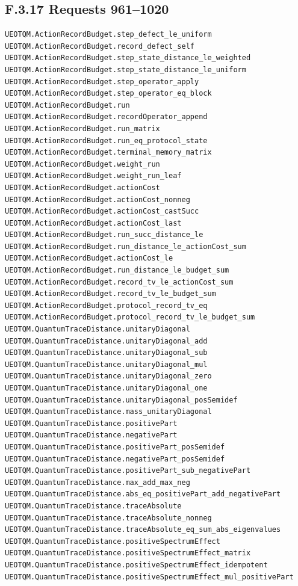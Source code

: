\documentclass[
  11pt,
  oneside]{book}
\begin{document}
\subsection{F.3.17 Requests 961--1020}

\begin{Verbatim}[breaklines,breakanywhere,fontsize=\scriptsize]
UEOTQM.ActionRecordBudget.step_defect_le_uniform
UEOTQM.ActionRecordBudget.record_defect_self
UEOTQM.ActionRecordBudget.step_state_distance_le_weighted
UEOTQM.ActionRecordBudget.step_state_distance_le_uniform
UEOTQM.ActionRecordBudget.step_operator_apply
UEOTQM.ActionRecordBudget.step_operator_eq_block
UEOTQM.ActionRecordBudget.run
UEOTQM.ActionRecordBudget.recordOperator_append
UEOTQM.ActionRecordBudget.run_matrix
UEOTQM.ActionRecordBudget.run_eq_protocol_state
UEOTQM.ActionRecordBudget.terminal_memory_matrix
UEOTQM.ActionRecordBudget.weight_run
UEOTQM.ActionRecordBudget.weight_run_leaf
UEOTQM.ActionRecordBudget.actionCost
UEOTQM.ActionRecordBudget.actionCost_nonneg
UEOTQM.ActionRecordBudget.actionCost_castSucc
UEOTQM.ActionRecordBudget.actionCost_last
UEOTQM.ActionRecordBudget.run_succ_distance_le
UEOTQM.ActionRecordBudget.run_distance_le_actionCost_sum
UEOTQM.ActionRecordBudget.actionCost_le
UEOTQM.ActionRecordBudget.run_distance_le_budget_sum
UEOTQM.ActionRecordBudget.record_tv_le_actionCost_sum
UEOTQM.ActionRecordBudget.record_tv_le_budget_sum
UEOTQM.ActionRecordBudget.protocol_record_tv_eq
UEOTQM.ActionRecordBudget.protocol_record_tv_le_budget_sum
UEOTQM.QuantumTraceDistance.unitaryDiagonal
UEOTQM.QuantumTraceDistance.unitaryDiagonal_add
UEOTQM.QuantumTraceDistance.unitaryDiagonal_sub
UEOTQM.QuantumTraceDistance.unitaryDiagonal_mul
UEOTQM.QuantumTraceDistance.unitaryDiagonal_zero
UEOTQM.QuantumTraceDistance.unitaryDiagonal_one
UEOTQM.QuantumTraceDistance.unitaryDiagonal_posSemidef
UEOTQM.QuantumTraceDistance.mass_unitaryDiagonal
UEOTQM.QuantumTraceDistance.positivePart
UEOTQM.QuantumTraceDistance.negativePart
UEOTQM.QuantumTraceDistance.positivePart_posSemidef
UEOTQM.QuantumTraceDistance.negativePart_posSemidef
UEOTQM.QuantumTraceDistance.positivePart_sub_negativePart
UEOTQM.QuantumTraceDistance.max_add_max_neg
UEOTQM.QuantumTraceDistance.abs_eq_positivePart_add_negativePart
UEOTQM.QuantumTraceDistance.traceAbsolute
UEOTQM.QuantumTraceDistance.traceAbsolute_nonneg
UEOTQM.QuantumTraceDistance.traceAbsolute_eq_sum_abs_eigenvalues
UEOTQM.QuantumTraceDistance.positiveSpectrumEffect
UEOTQM.QuantumTraceDistance.positiveSpectrumEffect_matrix
UEOTQM.QuantumTraceDistance.positiveSpectrumEffect_idempotent
UEOTQM.QuantumTraceDistance.positiveSpectrumEffect_mul_positivePart

\end{Verbatim}
\end{document}

